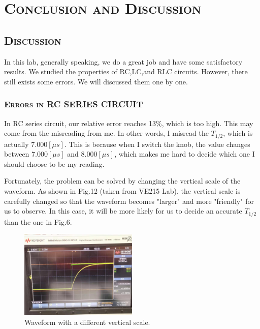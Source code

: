 \documentclass[a4paper,12pt]{article}
\begin{document}
\newpage
\section{\textsc{Conclusion and Discussion}}
\subsection{\textsc{Discussion}}
In this lab, generally speaking, we do a great job and have some satisfactory results. We studied the properties of RC,LC,and RLC circuits. However, there still exists some errors. We will discussed them one by one.
\subsubsection{\textsc{Errors in RC SERIES CIRCUIT}}
In RC series circuit, our relative error reaches 13\%, which is too high. This may come from the misreading from me. In other words, I misread the $T_{1/2}$, which is actually $7.000[\mu s]$. This is because when I switch the knob, the value changes between $7.000[\mu s]$ and $8.000[\mu s]$, which makes me hard to decide which one I should choose to be my reading. 
\par Fortunately, the problem can be solved by changing the vertical scale of the waveform. As shown in Fig.12 (taken from VE215 Lab), the vertical scale is carefully changed so that the waveform becomes "larger" and more "friendly" for us to observe. In this case, it will be more likely for us to decide an accurate $T_{1/2}$ than the one in Fig.6.

\begin{figure}[htb] 
    \centering
    \includegraphics[width=0.5\textwidth]{d1} 
    \caption{Waveform with a different vertical scale.} 
\end{figure}
\end{document}
